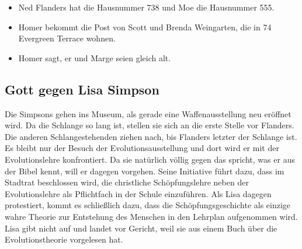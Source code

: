 \notiz{
}
\begin{itemize}
	\item Ned Flanders hat die Hausnummer 738 und Moe die Hausnummer 555.
	\item Homer bekommt die Post von Scott und Brenda Weingarten, die in 74 Evergreen Terrace wohnen.
	\item Homer sagt, er und Marge seien gleich alt.
\end{itemize}

\subsection{Gott gegen Lisa Simpson}\label{HABF14}
Die Simpsons gehen ins Museum, als gerade eine Waffenausstellung neu eröffnet wird. Da die Schlange so lang ist, stellen sie sich an die erste Stelle vor Flanders. Die anderen Schlangestehenden ziehen nach, bis Flanders letzter der Schlange ist. Es bleibt nur der Besuch der Evolutionsausstellung und dort wird er mit der Evolutionslehre konfrontiert. Da sie natürlich völlig gegen das spricht, was er aus der Bibel kennt, will er dagegen vorgehen. Seine Initiative führt dazu, dass im Stadtrat beschlossen wird, die christliche Schöpfungslehre neben der Evolutionslehre als Pflichtfach in der Schule einzuführen. Als Lisa dagegen protestiert, kommt es schließlich dazu, dass die Schöpfungsgeschichte als einzige wahre Theorie zur Entstehung des Menschen in den Lehrplan aufgenommen wird. Lisa gibt nicht auf und landet vor Gericht, weil sie aus einem Buch über die Evolutionstheorie vorgelesen hat.




